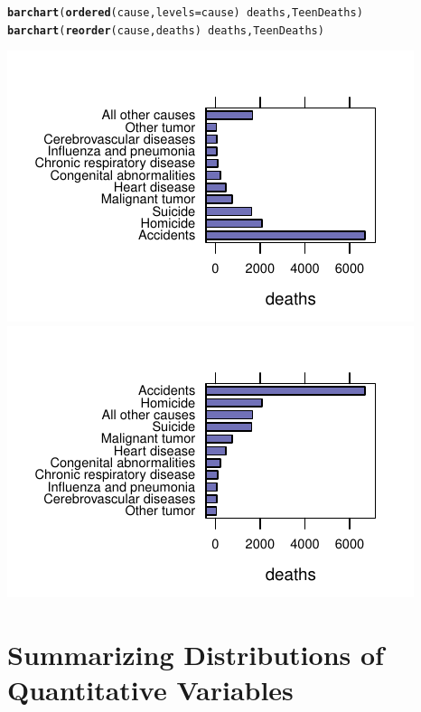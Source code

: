 \documentclass[twoside]{book}\usepackage[]{graphicx}\usepackage[]{xcolor}
\makeatletter
\def\maxwidth{ %
  \ifdim\Gin@nat@width>\linewidth
    \linewidth
  \else
    \Gin@nat@width
  \fi
}
\newcommand{\hlopt}[1]{\textcolor[rgb]{0,0,0}{#1}}%
\newcommand{\hlstd}[1]{\textcolor[rgb]{0.345,0.345,0.345}{#1}}%
\newcommand{\hlkwc}[1]{\textcolor[rgb]{0.333,0.667,0.333}{#1}}%
\newcommand{\hlkwd}[1]{\textcolor[rgb]{0.737,0.353,0.396}{\textbf{#1}}}%
\newenvironment{kframe}{%
 \def\at@end@of@kframe{}%
 \ifinner\ifhmode%
  \def\at@end@of@kframe{\end{minipage}}%
  \begin{minipage}{\columnwidth}%
 \fi\fi%
 \def\FrameCommand##1{\hskip\@totalleftmargin \hskip-\fboxsep
 \colorbox{shadecolor}{##1}\hskip-\fboxsep
     \hskip-\linewidth \hskip-\@totalleftmargin \hskip\columnwidth}%
 \MakeFramed {\advance\hsize-\width
   \@totalleftmargin\z@ \linewidth\hsize
   \@setminipage}}%
 {\par\unskip\endMakeFramed%
 \at@end@of@kframe}
\newenvironment{knitrout}{}{} %
\makeatother
\begin{document}
\begin{knitrout}
\color{fgcolor}\begin{kframe}
\begin{alltt}
\hlkwd{barchart}\hlstd{(} \hlkwd{ordered}\hlstd{(cause,} \hlkwc{levels}\hlstd{=cause)} \hlopt{~} \hlstd{deaths, TeenDeaths)}
\hlkwd{barchart}\hlstd{(} \hlkwd{reorder}\hlstd{(cause, deaths)} \hlopt{~} \hlstd{deaths, TeenDeaths)}
\end{alltt}
\end{kframe}

{\centering \includegraphics[width=\maxwidth]{figures/fig-teen-deaths-order-1} 
\includegraphics[width=\maxwidth]{figures/fig-teen-deaths-order-2} 

}



\end{knitrout}


\section{Summarizing Distributions of Quantitative Variables}
\end{document}
